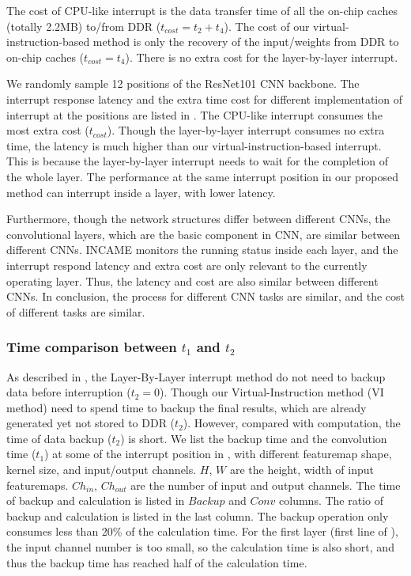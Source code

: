 The cost of CPU-like interrupt is the data transfer time of all the on-chip caches (totally 2.2MB) to/from DDR ($t_{cost} = t_2+t_4$). The cost of our virtual-instruction-based method is only the recovery of the input/weights from DDR to on-chip caches ($t_{cost} = t_4$). There is no extra cost for the layer-by-layer interrupt.



We randomly sample 12 positions of the ResNet101 CNN backbone. The interrupt response latency and the extra time cost for different implementation of interrupt at the positions are listed in .
The CPU-like interrupt consumes the most extra cost ($t_{cost}$). Though the layer-by-layer interrupt consumes no extra time, the latency is much higher than our virtual-instruction-based interrupt. 
This is because the layer-by-layer interrupt needs to wait for the completion of the whole layer. The performance at the same interrupt position in our proposed method can interrupt inside a layer, with lower latency.

Furthermore, though the network structures differ between different CNNs, the convolutional layers, which are the basic component in CNN, are similar between different CNNs. 
INCAME monitors the running status inside each layer, and the interrupt respond latency and extra cost are only relevant to the currently operating layer. Thus, the latency and cost are also similar between different CNNs. In conclusion, the process for different CNN tasks are similar, and the cost of different tasks are similar.

\subsubsection{ Time comparison between $t_1$ and $t_2$ }
\label{sec:expt1t2}
As described in , the Layer-By-Layer interrupt method do not need to backup data before interruption ($t_2 = 0$). Though our Virtual-Instruction method (VI method) need to spend time to backup the final results, which are already generated yet not stored to DDR ($t_2$). However, compared with computation, the time of data backup ($t_2$) is short. We list the backup time and the convolution time ($t_1$) at some of the interrupt position in , with different featuremap shape, kernel size, and input/output channels. $H$, $W$ are the height, width of input featuremaps. $Ch_{in}$, $Ch_{out}$ are the number of input and output channels. The time of backup and calculation is listed in $Backup$ and $Conv$ columns. The ratio of backup and calculation is listed in the last column. The backup operation only consumes less than 20\% of the calculation time. For the first layer (first line of ), the input channel number is too small, so the calculation time is also short, and thus the backup time has reached half of the calculation time. 

